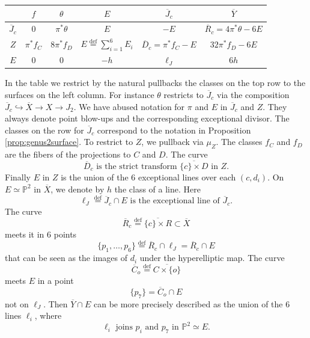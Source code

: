 \documentclass[12pt]{amsart}
\theoremstyle{definition}
\newcommand{\bb}{\ensuremath{\mathfrak{b}}}
\newcommand{\deq}{\ensuremath{\stackrel{\textrm{def}}{=}}}
\newcommand{\?}{ \circled{{\large\bf ?}}}
\let\bb\mathbb
\begin{document}
\begin{center}
\begin{tabular}{|c|c|c|c|c|c|}
	\hline 
	 & $f$& $\theta$& $E$ &$\overline J_c$& $\overline Y$\\ \hline\hline 
	$\overline J_c$&  $0$ & $\pi^*\theta$& $E$& $-E$ & $\overline R_c=4\pi^*\theta-6E$\\
	\hline 
	$Z$& $\pi^*f_C$ & $8\pi^*f_D$& $E\deq\sum_{i=1}^6E_i$ & $\overline D_c=\pi^*f_C-E$ & $32\pi^*f_D-6E$ 	\\
	\hline $E$ & $0$& $0$& $-h$&  $\ell_J$& $6h$\\ \hline\hline 
\end{tabular}
\end{center}
In the table we restrict by the natural pullbacks the classes on the top row to the surfaces on the left column. For instance $\theta$ restricts to $\overline J_c$ via the composition $\overline J_c\hookrightarrow\overline X\to X\to J_2$. We have abused notation for $\pi$ and $E$ in $\overline J_c$ and $Z$. They always denote point blow-ups and the corresponding exceptional divisor. The classes on the row for $\overline J_c$ correspond to the notation in Proposition \ref{prop:genus2surface}. To restrict to $Z$, we pullback via $\mu_Z$. The classes $f_C$ and $f_D$ are the fibers of the projections to $C$ and $D$. The curve 
\[\overline D_c\text{ is the strict transform }\overline{\{c\}\times D}\text{ in }Z.\]
Finally $E$ in $Z$ is the union of the 6 exceptional lines over each $(c,d_i)$. On $E\simeq\bb P^2$ in $\overline X$, we denote by $h$ the class of a line. Here 
\[\ell_J\deq\overline J_c\cap E\text{ is the exceptional line of }\overline J_c.\] The curve 
\[\overline R_c\deq\overline{\{c\}\times R}\subset\overline X\] 
meets it in 6 points 
\[\{p_1,\ldots,p_6\}\deq \overline R_c\cap \ell_J=\overline R_c\cap E\] that can be seen as the images of $d_i$ under the hyperelliptic map. The curve 
\[\overline C_o\deq\overline{C\times\{o\}}\] 
meets $E$ in a point 
\[\{p_7\}=\overline C_o\cap E\] not on $\ell_J$. Then $\overline Y\cap E$ can be more precisely described as the union of the 6 lines $\ell_i$, where
\[\ell_i\text{ joins }p_i\text{ and }p_7\text{ in }\bb P^2\simeq E.\]
\end{document}
